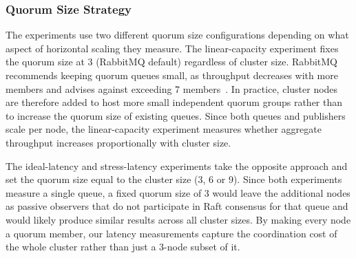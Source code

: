 \subsubsection{Quorum Size Strategy}

The experiments use two different quorum size configurations depending on what aspect of horizontal scaling they measure. The linear-capacity experiment fixes the quorum size at 3 (RabbitMQ default) regardless of cluster size. RabbitMQ recommends keeping quorum queues small, as throughput decreases with more members and advises against exceeding 7 members~\cite{rmq_quorum_docs}. In practice, cluster nodes are therefore added to host more small independent quorum groups rather than to increase the quorum size of existing queues. Since both queues and publishers scale per node, the linear-capacity experiment measures whether aggregate throughput increases proportionally with cluster size.

The ideal-latency and stress-latency experiments take the opposite approach and set the quorum size equal to the cluster size (3, 6 or 9). Since both experiments measure a single queue, a fixed quorum size of 3 would leave the additional nodes as passive observers that do not participate in Raft consensus for that queue and would likely produce similar results across all cluster sizes. By making every node a quorum member, our latency measurements capture the coordination cost of the whole cluster rather than just a 3-node subset of it.